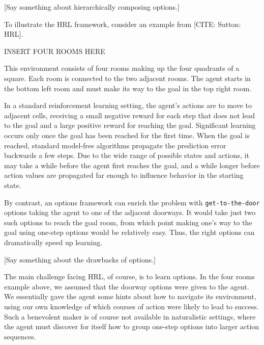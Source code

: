 \documentclass{article}
\begin{document}
[Say something about hierarchically composing options.]

To illustrate the HRL framework, consider an example from [CITE: Sutton: HRL].

\begin{center}
	INSERT FOUR ROOMS HERE
\end{center}

This environment consists of four rooms making up the four quadrants of a square.
Each room is connected to the two adjacent rooms.
The agent starts in the bottom left room and must make its way to the goal in the top right room.

In a standard reinforcement learning setting, the agent's actions are to move to adjacent cells, receiving a small negative reward for each step that does not lead to the goal and a large positive reward for reaching the goal.
Significant learning occurs only once the goal has been reached for the first time.
When the goal is reached, standard model-free algorithms propagate the prediction error backwards a few steps.
Due to the wide range of possible states and actions, it may take a while before the agent first reaches the goal, and a while longer before action values are propagated far enough to influence behavior in the starting state.

By contrast, an options framework can enrich the problem with \texttt{get-to-the-door} options taking the agent to one of the adjacent doorways.
It would take just two such options to reach the goal room, from which point making one's way to the goal using one-step options would be relatively easy.
Thus, the right options can dramatically speed up learning.

[Say something about the drawbacks of options.]

The main challenge facing HRL, of course, is to learn options.
In the four rooms example above, we assumed that the doorway options were given to the agent.
We essentially gave the agent some hints about how to navigate its environment, using our own knowledge of which courses of action were likely to lead to success.
Such a benevolent maker is of course not available in naturalistic settings, where the agent must discover for itself how to group one-step options into larger action sequences.
\end{document}
